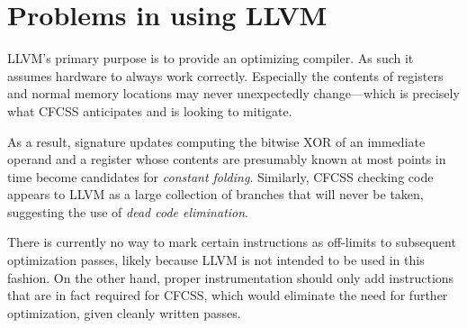 
\section{Problems in using LLVM}

LLVM's primary purpose is to provide an optimizing compiler. As such it assumes
hardware to always work correctly. Especially the contents of registers and
normal memory locations may never unexpectedly change—which is precisely what
CFCSS anticipates and is looking to mitigate.

As a result, signature updates computing the bitwise XOR of an immediate
operand and a register whose contents are presumably known at most points in
time become candidates for \emph{constant folding}. Similarly, CFCSS checking
code appears to LLVM as a large collection of branches that will never be
taken, suggesting the use of \emph{dead code elimination}.

There is currently no way to mark certain instructions as off-limits to
subsequent optimization passes, likely because LLVM is not intended to be used
in this fashion. On the other hand, proper instrumentation should only add
instructions that are in fact required for CFCSS, which would eliminate the
need for further optimization, given cleanly written passes.



